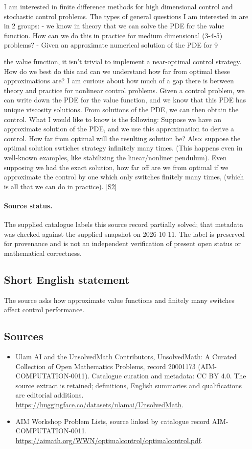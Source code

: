 \documentclass[11pt]{article}
\newcommand{\sref}[2]{\hyperlink{source:#1:#2}{[S#2]}}
\begin{document}
I am interested in finite difference methods for high dimensional control and stochastic control problems. The types of general questions I am interested in are in 2 groups: - we know in theory that we can solve the PDE for the value function. How can we do this in practice for medium dimensional (3-4-5) problems? - Given an approximate numerical solution of the PDE for 9

the value function, it isn't trivial to implement a near-optimal control strategy. How do we best do this and can we understand how far from optimal these approximations are? I am curious about how much of a gap there is between theory and practice for nonlinear control problems. Given a control problem, we can write down the PDE for the value function, and we know that this PDE has unique viscosity solutions. From solutions of the PDE, we can then obtain the control. What I would like to know is the following: Suppose we have an approximate solution of the PDE, and we use this approximation to derive a control. How far from optimal will the resulting solution be? Also: suppose the optimal solution swtiches strategy infinitely many times. (This happens even in well-known examples, like stabilizing the linear/nonliner pendulum). Even supposing we had the exact solution, how far off are we from optimal if we approximate the control by one which only switches finitely many times, (which is all that we can do in practice). \sref{20001173}{2}
\paragraph{Source status.}
The supplied catalogue labels this source record partially solved; that metadata was checked against the supplied snapshot on 2026-10-11. The label is preserved for provenance and is not an independent verification of present open status or mathematical correctness.
\subsection{Short English statement}
The source asks how approximate value functions and finitely many switches affect control performance.
\subsection{Sources}
\begin{itemize}
\item[\hypertarget{source:20001173:1}{S1}] Ulam AI and the UnsolvedMath Contributors, UnsolvedMath: A Curated Collection of Open Mathematics Problems, record 20001173 (AIM-COMPUTATION-0011). Catalogue curation and metadata: CC BY 4.0. The source extract is retained; definitions, English summaries and qualifications are editorial additions.
\url{https://huggingface.co/datasets/ulamai/UnsolvedMath}.
\item[\hypertarget{source:20001173:2}{S2}] AIM Workshop Problem Lists, source linked by catalogue record AIM-COMPUTATION-0011.
\url{https://aimath.org/WWN/optimalcontrol/optimalcontrol.pdf}.
\end{itemize}
\end{document}
